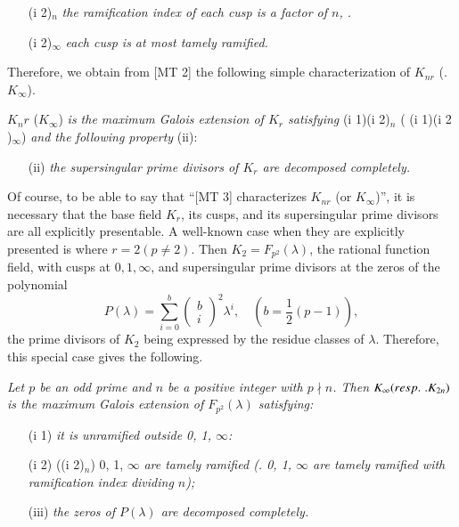 \begin{remark}
\begin{itemize}
\item[(i 2)$_n$] \textit{the ramification index of each cusp is a factor of $n$, \resp.}

\item[(i 2)$_\infty$] \textit{each cusp is at most tamely ramified.}
\end{itemize}
Therefore, we obtain from [MT 2] the following simple characterization of $K_{nr}$ (\resp. $K_\infty$).
\end{remark}

\medskip
[MT 3] $K_nr$ (\resp $K_\infty$) \textit{is the maximum Galois extension of $K_r$ satisfying} (i 1)(i 2)$_n$ (\textit{\resp} (i 1)(i 2 )$_\infty$) \textit{and the following property} (ii):

\begin{itemize}
\item[(ii)] \textit{the supersingular prime divisors of $K_r$ are decomposed completely.}
\end{itemize}

Of course, to be able to say that ``[MT 3] characterizes $K_{nr}$ (or $K_\infty$)'', it is necessary that the base field $K_r$, its cusps, and its supersingular prime divisors are all explicitly presentable. A well-known case when they are explicitly presented is where $r = 2 (p \neq 2)$. Then $K_2 = F_{p^2} (\lambda)$, the rational function field, with cusps at $0, 1, \infty$, and supersingular prime divisors at the zeros of the polynomial
$$
P(\lambda) = \sum\limits^b_{i=0} \begin{pmatrix}
b \\
i
\end{pmatrix}^2  \lambda^i, \quad (b = \frac{1}{2} (p-1)),
$$
the prime divisors of $K_2$ being expressed by the residue classes of $\lambda$. Therefore, this special case gives the following.
 
\textit{Let $p$ be an odd prime and $n$ be a positive integer with $p \nmid n$. Then $K_\infty ({resp.}\kern.3em. K_{2n})$ is the maximum Galois extension of $F_{p^2}(\lambda)$ satisfying:}
\begin{itemize}
\item[(i 1)] \textit{it is unramified outside 0, 1, $\infty$:}

\item[(i 2)] (\resp (i 2)$_n$) 0, 1, $\infty$ \textit{are tamely ramified (\resp. 0, 1, $\infty$ are tamely ramified with ramification index dividing $n$);}

\item[(iii)] \textit{the zeros of $P(\lambda)$ are decomposed completely.}
\end{itemize}

